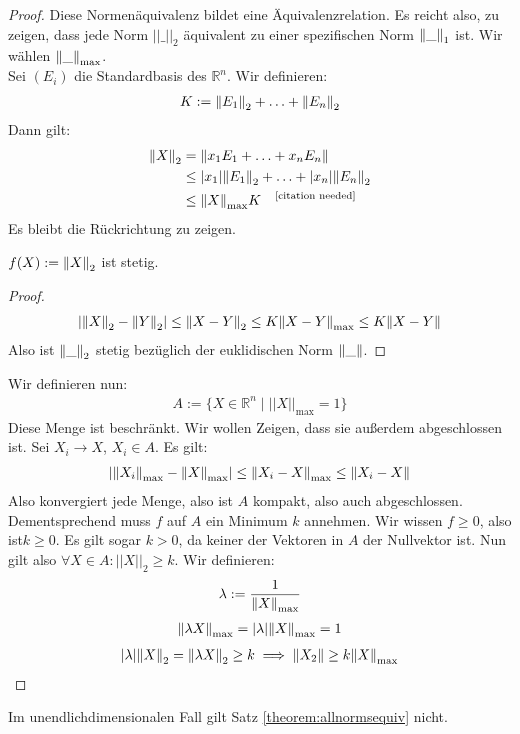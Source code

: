 \documentclass{report}
\newcommand{\bR}{\mathbb{R}}
\begin{document}
\begin{proof}
Diese Normenäquivalenz bildet eine Äquivalenzrelation. Es reicht also, zu zeigen, dass jede Norm $||\_||_2$ äquivalent zu einer spezifischen Norm $\norm{\_}_1$ ist. Wir wählen $\norm{\_}_{\max}$.\\
Sei $(E_i)$ die Standardbasis des $\bR^n$. Wir definieren:
\begin{align*}
 K := \norm{E_1}_2 + \hdots + \norm{E_n}_2
\end{align*}
Dann gilt:
\begin{align*}
 \norm{X}_2 &= \norm{x_1 E_1 + \hdots + x_n E_n}\\
         &\leq \abs{x_1}\norm{E_1}_2 + \hdots + \abs{x_n} \norm{E_n}_2\\
         &\leq \norm{X}_{\max} K \quad ^\text{[citation needed]}
\end{align*}
Es bleibt die Rückrichtung zu zeigen. 
\begin{lemma}
 $f(X) := \norm{X}_2$ ist stetig.
\end{lemma}
\begin{proof}
\begin{align*}
 \abs{\norm{X}_2 - \norm{Y}_2} \leq \norm{X - Y}_2 \leq K\norm{X - Y}_{\max} \leq K \norm{X - Y}
\end{align*}
Also ist $\norm{\_}_2$ stetig bezüglich der euklidischen Norm $\norm{\_}$.
\end{proof}
Wir definieren nun:
\begin{align*}
 A := \{X \in \bR^n \mid ||X||_{\max} = 1\}
\end{align*}
Diese Menge ist beschränkt. Wir wollen Zeigen, dass sie außerdem abgeschlossen ist. Sei $X_i \to X$, $X_i \in A$. Es gilt:
\begin{align*}
  \abs{\norm{X_i}_{\max} - \norm{X}_{\max}} \leq \norm{X_i - X}_{\max} \leq \norm{X_i - X}
\end{align*}
Also konvergiert jede Menge, also ist $A$ kompakt, also auch abgeschlossen. Dementsprechend muss $f$ auf $A$ ein Minimum $k$ annehmen. Wir wissen $f \geq 0$, also ist$k \geq 0$. Es gilt sogar $k > 0$, da keiner der Vektoren in $A$ der Nullvektor ist. Nun gilt also $\forall X \in A : ||X||_2 \geq k$. Wir definieren:
\begin{align*}
 \lambda := \frac{1}{\norm{X}_{\max}}
\end{align*}
\begin{align*}
 \norm{\lambda X}_{\max} = \abs{\lambda} \norm{X}_{\max} = 1 
\end{align*}
\begin{align*}
 |\lambda| \norm{X}_2 = \norm{\lambda X}_2 \geq k \implies \norm{X_2} \geq k \norm{X}_{\max}
\end{align*}
\end{proof}
\begin{anmerkung}
 Im unendlichdimensionalen Fall gilt Satz \ref{theorem:allnormsequiv} nicht.
\end{anmerkung}
%
%
%
%
%
%
%
%
\end{document}
